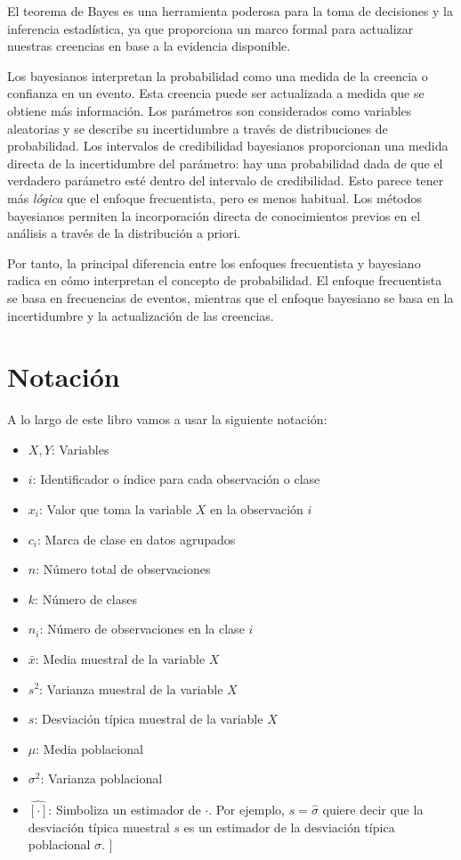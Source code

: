 \documentclass[
  letterpaper,
  DIV=11,
  numbers=noendperiod]{scrreprt}
\begin{document}
El teorema de Bayes es una herramienta poderosa para la toma de
decisiones y la inferencia estadística, ya que proporciona un marco
formal para actualizar nuestras creencias en base a la evidencia
disponible.

Los bayesianos interpretan la probabilidad como una medida de la
creencia o confianza en un evento. Esta creencia puede ser actualizada a
medida que se obtiene más información. Los parámetros son considerados
como variables aleatorias y se describe su incertidumbre a través de
distribuciones de probabilidad. Los intervalos de credibilidad
bayesianos proporcionan una medida directa de la incertidumbre del
parámetro: hay una probabilidad dada de que el verdadero parámetro esté
dentro del intervalo de credibilidad. Esto parece tener más
\emph{lógica} que el enfoque frecuentista, pero es menos habitual. Los
métodos bayesianos permiten la incorporación directa de conocimientos
previos en el análisis a través de la distribución a priori.

Por tanto, la principal diferencia entre los enfoques frecuentista y
bayesiano radica en cómo interpretan el concepto de probabilidad. El
enfoque frecuentista se basa en frecuencias de eventos, mientras que el
enfoque bayesiano se basa en la incertidumbre y la actualización de las
creencias.

\hypertarget{notaciuxf3n}{%
\section{Notación}\label{notaciuxf3n}}

A lo largo de este libro vamos a usar la siguiente notación:

\begin{itemize}
\item
  \(X, Y\): Variables
\item
  \(i\): Identificador o índice para cada observación o clase
\item
  \(x_i\): Valor que toma la variable \(X\) en la observación \(i\)
\item
  \(c_i\): Marca de clase en datos agrupados
\item
  \(n\): Número total de observaciones
\item
  \(k\): Número de clases
\item
  \(n_i\): Número de observaciones en la clase \(i\)
\item
  \(\bar{x}\): Media muestral de la variable \(X\)
\item
  \(s^2\): Varianza muestral de la variable \(X\)
\item
  \(s\): Desviación típica muestral de la variable \(X\)
\item
  \(\mu\): Media poblacional
\item
  \(\sigma^2\): Varianza poblacional
\item
  \(\hat{[\cdot]}\): Simboliza un estimador de \(\cdot\). Por ejemplo,
  \(s = \hat{\sigma}\) quiere decir que la desviación típica muestral
  \(s\) es un estimador de la desviación típica poblacional \(\sigma\).
  {]}
\end{itemize}
\end{document}
